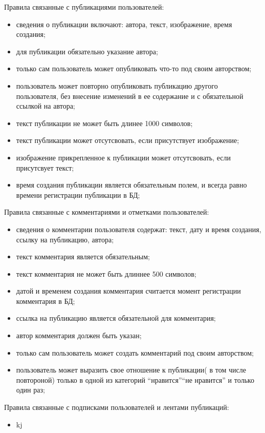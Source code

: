 Правила связанные с публикациями пользователей:
\begin{itemize}
\item сведения о публикации включают: автора, текст, изображение, время создания;
\item для публикации обязательно указание автора;
\item только сам пользователь может опубликовать что-то под своим авторством;
\item пользователь может повторно опубликовать публикацию другого пользователя, без внесение изменений в
  ее содержание и с обязательной ссылкой на автора;
\item текст публикации не может быть длинее 1000 символов;
\item текст публикации может отсутсвовать, если присутствует изображение;
\item изображение прикрепленное к публикации может отсутсвовать, если присутсвует текст;
\item время создания публикации является обязательным полем, и всегда равно времени регистрации публикации в БД;
\end{itemize}

Правила связанные с комментариями и отметками пользователей:
\begin{itemize}
\item сведения о комментарии пользователя содержат: текст, дату и время создания, ссылку на публикацию, автора;
\item текст комментария является обязательным;
\item текст комментария не может быть длиннее 500 символов;
\item датой и временем создания комментария считается момент регистрации комментария в БД;
\item ссылка на публикацию является обязательной для комментария;
\item автор комментария должен быть указан;
\item только сам пользователь может создать комментарий под своим авторством;
\item пользователь может выразить свое отношение к публикации( в том числе повтороной) только в одной
  из категорий ``нравится''\/``не нравится'' и только один раз;
\end{itemize}

Правила связанные с подписками пользователей и лентами публикаций:
\begin{itemize}
\item kj
\end{itemize}




